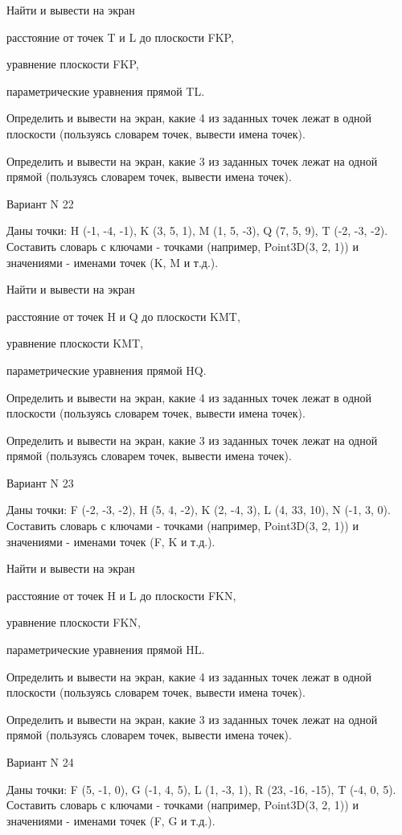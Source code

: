 \documentclass[11pt]{report}
\begin{document}
Найти и вывести на экран


расстояние от точек T и L до плоскости FKP,


уравнение плоскости FKP,


параметрические уравнения прямой TL.


Определить и вывести на экран, какие 4 из заданных точек лежат в одной плоскости (пользуясь словарем точек, вывести имена точек).


Определить и вывести на экран, какие 3 из заданных точек лежат на одной прямой (пользуясь словарем точек, вывести имена точек).

\newpage
Вариант N 22

Даны точки: H (-1, -4, -1), K (3, 5, 1), M (1, 5, -3), Q (7, 5, 9), T (-2, -3, -2).
Составить словарь с ключами - точками (например, Point3D(3, 2, 1)) и значениями - именами точек (K, M и т.д.).


Найти и вывести на экран


расстояние от точек H и Q до плоскости KMT,


уравнение плоскости KMT,


параметрические уравнения прямой HQ.


Определить и вывести на экран, какие 4 из заданных точек лежат в одной плоскости (пользуясь словарем точек, вывести имена точек).


Определить и вывести на экран, какие 3 из заданных точек лежат на одной прямой (пользуясь словарем точек, вывести имена точек).

\newpage
Вариант N 23

Даны точки: F (-2, -3, -2), H (5, 4, -2), K (2, -4, 3), L (4, 33, 10), N (-1, 3, 0).
Составить словарь с ключами - точками (например, Point3D(3, 2, 1)) и значениями - именами точек (F, K и т.д.).


Найти и вывести на экран


расстояние от точек H и L до плоскости FKN,


уравнение плоскости FKN,


параметрические уравнения прямой HL.


Определить и вывести на экран, какие 4 из заданных точек лежат в одной плоскости (пользуясь словарем точек, вывести имена точек).


Определить и вывести на экран, какие 3 из заданных точек лежат на одной прямой (пользуясь словарем точек, вывести имена точек).

\newpage
Вариант N 24

Даны точки: F (5, -1, 0), G (-1, 4, 5), L (1, -3, 1), R (23, -16, -15), T (-4, 0, 5).
Составить словарь с ключами - точками (например, Point3D(3, 2, 1)) и значениями - именами точек (F, G и т.д.).
\end{document}
